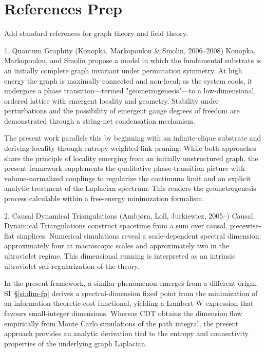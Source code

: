 \documentclass[11pt]{article}
\begin{document}
\section*{References Prep}

Add standard references for graph theory and field theory.

\vspace{1em}

1. Quantum Graphity (Konopka, Markopoulou \& Smolin, 2006–2008)
\quad Konopka, Markopoulou, and Smolin propose a model in which the fundamental substrate is an initially complete graph invariant under permutation symmetry. At high energy the graph is maximally connected and non-local; as the system cools, it undergoes a phase transition—termed "geometrogenesis"—to a low-dimensional, ordered lattice with emergent locality and geometry. Stability under perturbations and the possibility of emergent gauge degrees of freedom are demonstrated through a string-net condensation mechanism.

The present work parallels this by beginning with an infinite-clique substrate and deriving locality through entropy-weighted link pruning. While both approaches share the principle of locality emerging from an initially unstructured graph, the present framework supplements the qualitative phase-transition picture with volume-normalized couplings to regularize the continuum limit and an explicit analytic treatment of the Laplacian spectrum. This renders the geometrogenesis process calculable within a free-energy minimization formalism.

2. Causal Dynamical Triangulations (Ambj\o rn, Loll, Jurkiewicz, 2005–)
\quad Causal Dynamical Triangulations construct spacetime from a sum over causal, piecewise-flat simplices. Numerical simulations reveal a scale-dependent spectral dimension: approximately four at macroscopic scales and approximately two in the ultraviolet regime. This dimensional running is interpreted as an intrinsic ultraviolet self-regularization of the theory.

In the present framework, a similar phenomenon emerges from a different origin. SI~\S\ref{si:dim-fp} derives a spectral-dimension fixed point from the minimization of an information-theoretic cost functional, yielding a Lambert-W expression that favours small-integer dimensions. Whereas CDT obtains the dimension flow empirically from Monte Carlo simulations of the path integral, the present approach provides an analytic derivation tied to the entropy and connectivity properties of the underlying graph Laplacian.
\end{document}
